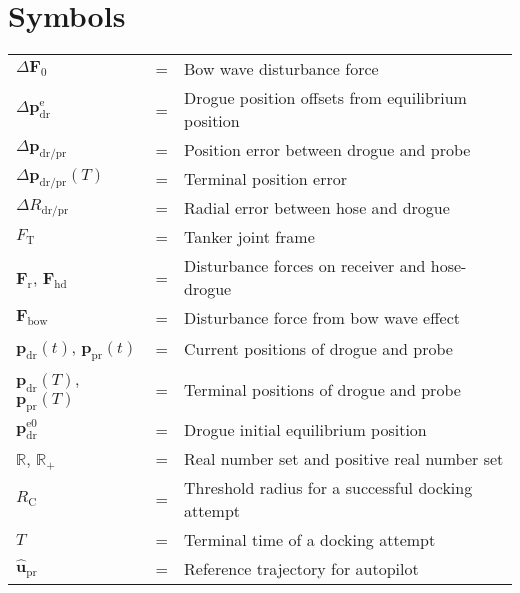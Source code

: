
\chapter*{Symbols}

\begin{tabular}{@{}lcl}
	${\Delta\mathbf{F}_{0}}$  & =  & Bow wave disturbance force \tabularnewline
	$\Delta{\mathbf{p}}_{\text{dr}}^{\text{e}}$  & =  & Drogue position offsets from equilibrium position \tabularnewline
	$\Delta{\mathbf{p}}_{\text{dr/pr}}$  & =  & Position error between drogue and probe \tabularnewline
	$\Delta{\mathbf{p}}_{\text{dr/pr}}\left(T\right)$  & =  & Terminal position error \tabularnewline
	$\Delta R_{\text{dr/pr}}$  & =  & Radial error between hose and drogue \tabularnewline
	$F_{\text{T}}$  & =  & Tanker joint frame \tabularnewline
	{$\mathbf{F}$}$_{\text{r}}$, {$\mathbf{F}$}$_{\text{hd}}$  & =  & Disturbance forces on receiver and hose-drogue \tabularnewline
	{$\mathbf{F}$}$_{\text{bow}}$  & =  & Disturbance force from bow wave effect \tabularnewline
	${\mathbf{p}}_{\text{dr}}\left(t\right)$, ${\mathbf{p}}_{\text{pr}}\left(t\right)$  & =  & Current positions of drogue and probe \tabularnewline
	${\mathbf{p}}_{\text{dr}}\left(T\right)$, ${\mathbf{p}}_{\text{pr}}\left(T\right)$  & =  & Terminal positions of drogue and probe \tabularnewline
	${\mathbf{p}}_{\text{dr}}^{\text{e0}}$  & =  & Drogue initial equilibrium position \tabularnewline
	$%
	\mathbb{R}%
	$, $%
	\mathbb{R}%
	_{+}$  & =  & Real number set and positive real number set \tabularnewline
	$R_{\text{C}}$  & =  & Threshold radius for a successful docking attempt \tabularnewline
	$T$  & =  & Terminal time of a docking attempt \tabularnewline
	$\mathbf{\hat{u}}_{\text{pr}}$  & =  & Reference trajectory for autopilot \tabularnewline
\end{tabular}

